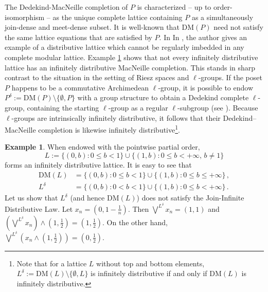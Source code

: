 \documentclass[12pt,a4paper]{amsart}
\numberwithin{equation}{section}
\theoremstyle{definition}
\newtheorem{exmp}[thm]{Example}
\newcommand{\lbigvee}[1]{\bigvee^{\scriptscriptstyle #1}}
\newcommand{\DM}{\text{DM}}
\begin{document}
The Dedekind-MacNeille completion of $ P$ is characterized -- up to order-isomorphism -- as the unique complete lattice containing $ P$ as a simultaneously join-dense and meet-dense subset.  It is well-known that $\DM(P)$ need not satisfy the same lattice equations that are satisfied by $P$.  In In \cite{Crawley}, the author gives an  example of a distributive lattice which cannot be regularly imbedded in any complete modular lattice.  %
Example \ref{exmp2} shows that not every infinitely distributive lattice has an infinitely distributive MacNeille completion.  This stands in sharp contrast to the situation in the setting of Riesz spaces and $\ell$-groups. If the poset $ P$ happens to be a commutative Archimedean $\ell$-group, it is possible to endow $P^\delta:=\DM(P)\setminus \{\emptyset, P\}$ with a group structure to obtain a Dedekind complete $\ell$-group, containing the starting $\ell$-group as a regular $\ell$-subgroup (see \cite{Clifford}).   Because $\ell$-groups are intrinsically infinitely distributive, it follows that their Dedekind–MacNeille completion is likewise infinitely distributive\footnote{Note that for a lattice $L$ without top and bottom elements, $L^\delta:=\DM(L)\setminus\{\emptyset,L\}$ is infinitely distributive if and only if $\DM(L)$ is infinitely distributive.}.






\begin{exmp}\label{exmp2}
 When endowed with the pointwise partial order, 
 \[{L}:= \{(0,b) : 0 \leq b < 1\} \cup  \{(1,b) : 0 \leq b<+\infty,\,b\neq 1\}\] forms an infinitely distributive lattice.  It is easy to see that
  \begin{align*}
  \DM(L)&= \{(0,b) : 0 \leq b < 1\} \cup  \{(1,b) : 0 \leq b \leq +\infty\}\,, \\
   L^\delta&=\{(0,b) : 0 < b < 1\} \cup  \{(1,b) : 0 \leq b < +\infty\}\,.
   \end{align*}
 Let us show that $L^\delta$ (and hence $\DM(L)$) does not satisfy the Join-Infinite Distributive Law.  Let $x_{n} = (0,1-\frac{1}{n})$. Then $\lbigvee{{L}^{\delta}} x_{n} = (1,1)$ and $\left(\lbigvee{{L}^{\delta}} x_{n}\right) \wedge (1,\frac{1}{2}) = (1,\frac{1}{2})$. On the  other hand, $\lbigvee{{L}^{\delta}} (x_{n}\wedge (1,\frac{1}{2})) = (0,\frac{1}{2})$. 
\end{exmp}
\end{document}
